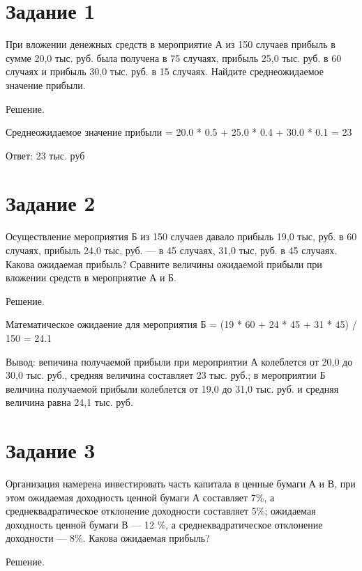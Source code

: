 \documentclass[14pt,a4paper]{extarticle}
\begin{document}
\section{Задание 1}
\begin{sloppypar}
    При вложении денежных средств в мероприятие А из 150 случаев прибыль в
    сумме 20,0 тыс. руб. была получена в 75 случаях, прибыль 25,0 тыс. руб. в 60 случаях и
    прибыль 30,0 тыс. руб. в 15 случаях. Найдите среднеожидаемое значение прибыли.
\end{sloppypar}

Решение.

Среднеожидаемое значение прибыли = 20.0 * 0.5 + 25.0 * 0.4 + 30.0 * 0.1 = 23

    Ответ: 23 тыс. руб

\section{Задание 2}
\begin{sloppypar}
    Осуществление мероприятия Б из 150 случаев давало прибыль 19,0 тыс, руб. в 60
    случаях, прибыль 24,0 тыс, руб. — в 45 случаях, 31,0 тыс, руб. в 45 случаях. Какова
    ожидаемая прибыль? Сравните величины ожидаемой прибыли при вложении средств в
мероприятие А и Б.
\end{sloppypar}

Решение.

Математическое ожидаение для мероприятия Б = (19 * 60 + 24 * 45 + 31 * 45) / 150 = 24.1

Вывод: вепичина получаемой прибыли при мероприятии А колеблется от 20,0 до 30,0 тыс. руб., средняя величина составляет 23 тыс. руб.; в мероприятии Б величина получаемой прибыли колеблется от 19,0 до 31,0 тыс. руб. и средняя величина равна 24,1 тыс. руб.


\section{Задание 3}
\begin{sloppypar}
    Организация намерена инвестировать часть капитала в ценные бумаги А и В, при
    этом ожидаемая доходность ценной бумаги А составляет 7\%, а среднеквадратическое
    отклонение доходности составляет 5\%; ожидаемая доходность ценной бумаги В — 12
    \%, а среднеквадратическое отклонение доходности — 8\%. Какова ожидаемая прибыль?
\end{sloppypar}

Решение.
\end{document}
